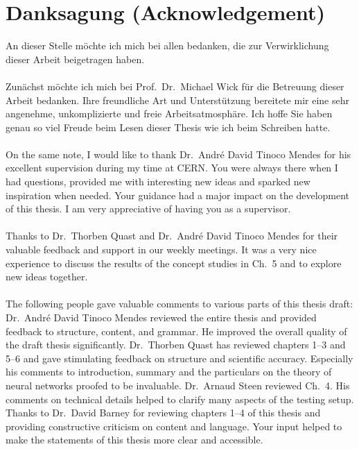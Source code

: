 \documentclass[a4paper, 12pt, twoside]{article}
\begin{document}
% 



\newpage
\thispagestyle{empty}
\section*{Danksagung (Acknowledgement)}
An dieser Stelle möchte ich mich bei allen bedanken, die zur Verwirklichung dieser Arbeit beigetragen haben.\\
\\
Zunächst möchte ich mich bei Prof.\ Dr.\ Michael Wick für die Betreuung dieser Arbeit bedanken. Ihre freundliche Art und Unterstützung bereitete mir eine sehr angenehme, unkomplizierte und freie Arbeitsatmosphäre. Ich hoffe Sie haben genau so viel Freude beim Lesen dieser Thesis wie ich beim Schreiben hatte.\\
\\
On the same note, I would like to thank Dr.\ Andr\'e David Tinoco Mendes for his excellent supervision during my time at CERN. You were always there when I had questions, provided me with interesting new ideas and sparked new inspiration when needed. Your guidance had a major impact on the development of this thesis. I am very appreciative of having you as a supervisor.\\
\\
Thanks to Dr.\ Thorben Quast and Dr.\ Andr\'e David Tinoco Mendes for their valuable feedback and support in our weekly meetings. It was a very nice experience to discuss the results of the concept studies in Ch.~5 and to explore new ideas together.\\
\\
The following people gave valuable comments to various parts of this thesis draft:\\
Dr.\ Andr\'e David Tinoco Mendes reviewed the entire thesis and provided feedback to structure, content, and grammar. He improved the overall quality of the draft thesis significantly. Dr.\ Thorben Quast has reviewed chapters 1--3 and 5--6 and gave stimulating feedback on structure and scientific accuracy. Especially his comments to introduction, summary and the particulars on the theory of neural networks proofed to be invaluable. Dr.\ Arnaud Steen reviewed Ch.~4. His comments on technical details helped to clarify many aspects of the testing setup. Thanks to Dr.\ David Barney for reviewing chapters 1--4 of this thesis and providing constructive criticism on content and language. Your input helped to make the statements of this thesis more clear and accessible.\\
\end{document}
